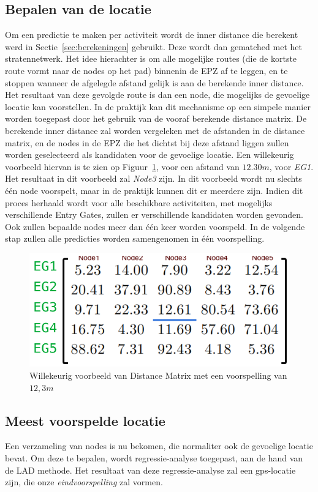 \subsection{Bepalen van de locatie}
Om een predictie te maken per activiteit wordt de inner distance die berekent
werd in Sectie~\ref{sec:berekeningen} gebruikt. Deze wordt dan gematched met
het stratennetwerk. Het idee hierachter is om alle mogelijke routes (die de
kortste route vormt naar de nodes op het pad) binnenin de \ac{EPZ} af te
leggen, en te stoppen wanneer de afgelegde afstand gelijk is aan de berekende
inner distance. Het resultaat van deze gevolgde route is dan een node, die
mogelijks de gevoelige locatie kan voorstellen. In de praktijk kan dit
mechanisme op een simpele manier worden toegepast door het gebruik van de
vooraf berekende distance matrix. De berekende inner distance zal worden
vergeleken met de afstanden in de distance matrix, en de nodes in de \ac{EPZ}
die het dichtst bij deze afstand liggen zullen worden geselecteerd als
kandidaten voor de gevoelige locatie. Een willekeurig voorbeeld hiervan is te
zien op Figuur~\ref{fig:matrix_prediction}, voor een afstand van $12.30m$, voor
\textit{EG1}. Het resultaat in dit voorbeeld zal \textit{Node3} zijn. In dit
voorbeeld wordt nu slechts één node voorspelt, maar in de praktijk kunnen dit
er meerdere zijn. Indien dit proces herhaald wordt voor alle beschikbare
activiteiten, met mogelijks verschillende Entry Gates, zullen er verschillende
kandidaten worden gevonden. Ook zullen bepaalde nodes meer dan één keer worden
voorspeld. In de volgende stap zullen alle predicties worden samengenomen in
één voorspelling.
\begin{figure}
    \centering
    \includegraphics[width=0.6\linewidth]{fig/RoadGraph/Matrix_Prediction.png}
    \caption{Willekeurig voorbeeld van Distance Matrix met een voorspelling van $12,3m$}\label{fig:matrix_prediction}
\end{figure}
\subsection{Meest voorspelde locatie}
Een verzameling van nodes is nu bekomen, die normaliter ook de gevoelige
locatie bevat. Om deze te bepalen, wordt regressie-analyse toegepast, aan de
hand van de \ac{LAD} methode. Het resultaat van deze regressie-analyse zal een
\ac{gps}-locatie zijn, die onze \textit{eindvoorspelling} zal vormen.

